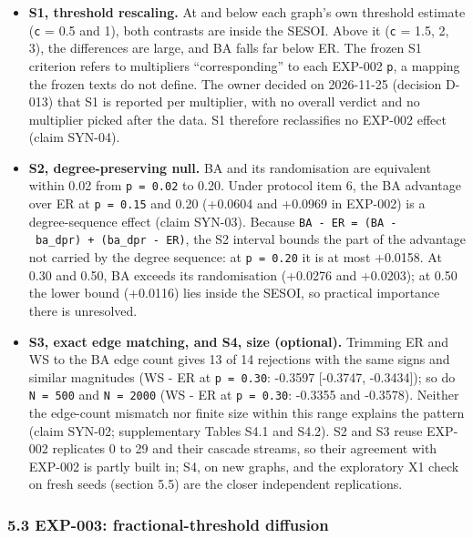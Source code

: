 \documentclass[
]{article}
\providecommand{\tightlist}{%
  \setlength{\itemsep}{0pt}\setlength{\parskip}{0pt}}
\begin{document}
\begin{itemize}
\tightlist
\item
  \textbf{S1, threshold rescaling.} At and below each graph's own
  threshold estimate (\texttt{c} = 0.5 and 1), both contrasts are inside
  the SESOI. Above it (\texttt{c} = 1.5, 2, 3), the differences are
  large, and BA falls far below ER. The frozen S1 criterion refers to
  multipliers ``corresponding'' to each EXP-002 \texttt{p}, a mapping
  the frozen texts do not define. The owner decided on 2026-11-25
  (decision D-013) that S1 is reported per multiplier, with no overall
  verdict and no multiplier picked after the data. S1 therefore
  reclassifies no EXP-002 effect (claim SYN-04).
\item
  \textbf{S2, degree-preserving null.} BA and its randomisation are
  equivalent within 0.02 from \texttt{p\ =\ 0.02} to 0.20. Under
  protocol item 6, the BA advantage over ER at \texttt{p\ =\ 0.15} and
  0.20 (+0.0604 and +0.0969 in EXP-002) is a degree-sequence effect
  (claim SYN-03). Because
  \texttt{BA\ -\ ER\ =\ (BA\ -\ ba\_dpr)\ +\ (ba\_dpr\ -\ ER)}, the S2
  interval bounds the part of the advantage not carried by the degree
  sequence: at \texttt{p\ =\ 0.20} it is at most +0.0158. At 0.30 and
  0.50, BA exceeds its randomisation (+0.0276 and +0.0203); at 0.50 the
  lower bound (+0.0116) lies inside the SESOI, so practical importance
  there is unresolved.
\item
  \textbf{S3, exact edge matching, and S4, size (optional).} Trimming ER
  and WS to the BA edge count gives 13 of 14 rejections with the same
  signs and similar magnitudes (WS - ER at \texttt{p\ =\ 0.30}: -0.3597
  {[}-0.3747, -0.3434{]}); so do \texttt{N\ =\ 500} and
  \texttt{N\ =\ 2000} (WS - ER at \texttt{p\ =\ 0.30}: -0.3355 and
  -0.3578). Neither the edge-count mismatch nor finite size within this
  range explains the pattern (claim SYN-02; supplementary Tables S4.1
  and S4.2). S2 and S3 reuse EXP-002 replicates 0 to 29 and their
  cascade streams, so their agreement with EXP-002 is partly built in;
  S4, on new graphs, and the exploratory X1 check on fresh seeds
  (section 5.5) are the closer independent replications.
\end{itemize}

\subsubsection{5.3 EXP-003: fractional-threshold
diffusion}\label{exp-003-fractional-threshold-diffusion}
\end{document}

